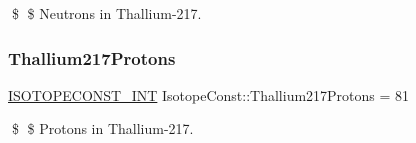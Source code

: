 \$ \$ Neutrons in Thallium-\/217. \mbox{\label{group___isotope_const-_thallium-_tl217_gaffc8fc7ebc26fda64d52df7e4a403398}} 
\subsubsection{\texorpdfstring{Thallium217\+Protons}{Thallium217Protons}}
{\footnotesize\ttfamily \mbox{\hyperlink{group___isotope_const-_macros_ga5f18360b3e99483a35c32d789e62621c}{I\+S\+O\+T\+O\+P\+E\+C\+O\+N\+S\+T\+\_\+\+I\+NT}} Isotope\+Const\+::\+Thallium217\+Protons = 81}

\$ \$ Protons in Thallium-\/217. 